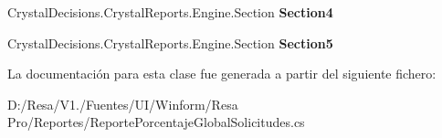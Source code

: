 \begin{DoxyCompactItemize}
\item 
Crystal\+Decisions.\+Crystal\+Reports.\+Engine.\+Section {\bfseries Section4}\hspace{0.3cm}{\ttfamily  [get]}\label{class_resa___pro_1_1_reportes_1_1_reporte_porcentaje_global_solicitudes_ae6b0c3427e4c8f9a5314a72c0f2299d4}

\item 
Crystal\+Decisions.\+Crystal\+Reports.\+Engine.\+Section {\bfseries Section5}\hspace{0.3cm}{\ttfamily  [get]}\label{class_resa___pro_1_1_reportes_1_1_reporte_porcentaje_global_solicitudes_aa64a6c78a7c45e544af0b09b305c800b}

\end{DoxyCompactItemize}


La documentación para esta clase fue generada a partir del siguiente fichero\+:\begin{DoxyCompactItemize}
\item 
D\+:/\+Resa/\+V1./\+Fuentes/\+U\+I/\+Winform/\+Resa Pro/\+Reportes/Reporte\+Porcentaje\+Global\+Solicitudes.\+cs\end{DoxyCompactItemize}
